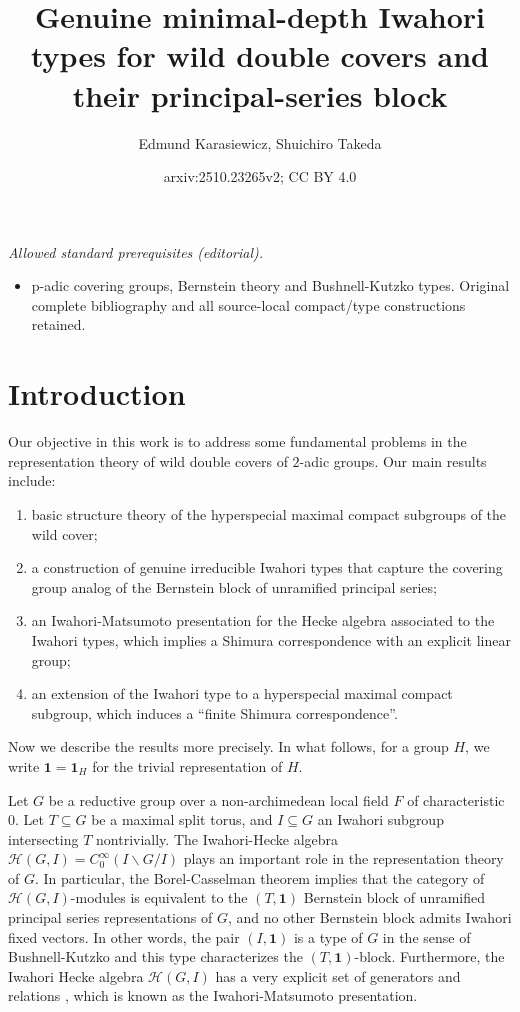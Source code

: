 \documentclass[10pt, letterpaper]{amsart}
\title{Genuine minimal-depth Iwahori types for wild double covers and their principal-series block}
\author{Edmund Karasiewicz, Shuichiro Takeda}
\date{arxiv:2510.23265v2; CC BY 4.0}
\theoremstyle{plain}
\theoremstyle{definition}
\numberwithin{equation}{section}
\newcommand{\Hcal}{\mathcal{H}}
\newcommand{\one}{\mathbf{1}}
\begin{document}
\maketitle
\noindent\textit{Allowed standard prerequisites (editorial).}\begin{itemize}
\item p-adic covering groups, Bernstein theory and Bushnell-Kutzko types. Original complete bibliography and all source-local compact/type constructions retained.
\end{itemize}\medskip
\section{Introduction}



Our objective in this work is to address some fundamental problems in the representation theory of wild double covers of $2$-adic groups. Our main results include: 
\begin{enumerate}[(1)]
	\item\label{IntroListKStructure} basic structure theory of the hyperspecial maximal compact subgroups of the wild cover;
	\item\label{IntroListITypes} a construction of genuine irreducible Iwahori types that capture the covering group analog of the Bernstein block of unramified principal series;
        \item\label{IntroListIMPres} an Iwahori-Matsumoto presentation for the Hecke algebra associated to the Iwahori types, which implies a Shimura correspondence with an explicit linear group;
        \item\label{IntroListKType} an extension of the Iwahori type to a hyperspecial maximal compact subgroup, which induces a ``finite Shimura correspondence''.
\end{enumerate}
Now we describe the results more precisely. In what follows, for a group $H$, we write $\one=\one_{H}$ for the trivial representation of $H$.

Let $G$ be a reductive group over a non-archimedean local field $F$ of characteristic 0. Let $T\subseteq G$ be a maximal split torus, and $I\subseteq G$ an Iwahori subgroup intersecting $T$ nontrivially. The Iwahori-Hecke algebra $\Hcal(G, I)=C_0^\infty(I\backslash G\slash I)$ plays an important role in the representation theory of $G$. In particular, the Borel-Casselman theorem \cite[Theorem 4.10]{B76} implies that the category of $\Hcal(G, I)$-modules is equivalent to the $(T,\one)$ Bernstein block of unramified principal series representations of $G$, and no other Bernstein block admits Iwahori fixed vectors. In other words, the pair $(I, \one)$ is a type of $G$ in the sense of Bushnell-Kutzko \cite[(4.1) Definition]{BK98} and this type characterizes the $(T,\one)$-block. Furthermore, the Iwahori Hecke algebra $\Hcal(G, I)$ has a very explicit set of generators and relations \cite{IM}, which is known as the Iwahori-Matsumoto presentation.
\end{document}

